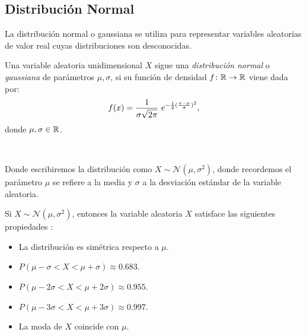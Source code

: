 \documentclass[oneside,openright,titlepage,numbers=noenddot,openany,headinclude,footinclude=true,
cleardoublepage=empty,abstractoff,BCOR=5mm,paper=a4,fontsize=12pt,main=spanish]{scrreprt}
\begin{document}
\subsection{Distribución Normal}

La distribución normal o gaussiana se utiliza para representar variables aleatorias de valor real cuyas distribuciones son desconocidas.\\

\begin{definition}
Una variable aleatoria unidimensional $X$ sigue una \textit{distribución normal} o \textit{gaussiana} de parámetros $\mu, \sigma$, si su función de densidad $f\colon \mathbb{R} \to \mathbb{R}$ viene dada por: $$f(x)=\ddfrac{1}{\sigma \sqrt{2\pi}} \ e^{-\frac{1}{2}(\frac{x-\mu}{\sigma})^2},$$
donde $\mu,\sigma\in \mathbb{R}$.
\end{definition}\

Donde escribiremos la distribución como $X \sim \mathcal{N}(\mu, \sigma^2)$, donde recordemos el parámetro $\mu$ se refiere a la media y $\sigma$ a la desviación estándar de la variable aleatoria.\\

\begin{proposition} \label{prop:propnormal}
Si $X \sim \mathcal{N}(\mu, \sigma^2)$, entonces la variable aleatoria $X$ satisface las siguientes propiedades :
\begin{itemize}
    \item La distribución es simétrica respecto a $\mu$.
    \item $P(\mu-\sigma < X < \mu+\sigma)\approx 0.683.$
    \item $P(\mu-2\sigma < X < \mu+2\sigma)\approx 0.955.$
    \item $P(\mu-3\sigma < X < \mu+3\sigma)\approx 0.997.$
    \item La moda de $X$ coincide con $\mu$.
\end{itemize}
\end{proposition}\
\end{document}
